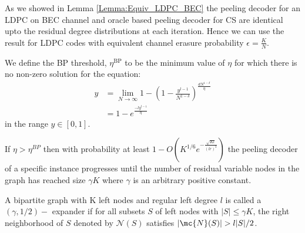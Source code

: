 \documentclass[conference]{IEEEtran}
\begin{document}
\begin{IEEEproof}
As we showed in Lemma \ref{Lemma:Equiv_LDPC_BEC} the peeling decoder for an LDPC on BEC channel and oracle based peeling decoder for CS are identical upto the residual degree distributions at each iteration. Hence we can use the result for LDPC codes \cite{richardson2008modern} with equivalent channel erasure probability $\epsilon=\frac{K}{N}$.
\end{IEEEproof}

\begin{definition}[BP Threshold]
We define the BP threshold, $\eta^{\text{BP}}$ to be the minimum value of $\eta$ for which there is no non-zero solution for the equation:
\begin{align*}
y&=\lim_{N\rightarrow\infty}1-\left(1-\frac{y^{l-1}}{N^{1-\delta}}\right)^{\frac{dN^{1-\delta}}{\eta}}\\
  &=1-e^{\frac{-ly^{l-1}}{\eta}}
\end{align*}
in the range $y\in [0,1]$.
\end{definition}


\begin{lemma}\cite{richardson2008modern}
\label{lem:PeelSmallGraph}
If $\eta>\eta^{BP}$ then with probability at least $1-O\left(K^{1/6}e^{-\frac{\sqrt{Kl}}{(lr)^3}}\right)$ the peeling decoder of a specific instance progresses until the number of residual variable nodes in the graph has reached size $\gamma K$ where $\gamma$ is an arbitrary positive constant.
\end{lemma}

\begin{definition}
\label{Def:ExpanderGraph}
A bipartite graph with K left nodes and regular left degree $l$ is called a $(\gamma,1/2)-$ expander if for all subsets $S$ of left nodes with $|S|\leq \gamma K$, the right neighborhood of $S$ denoted by $\mathcal{N}(S)$ satisfies $|\mc{N}(S)|>l|S|/2$.
\end{definition}
\end{document}
